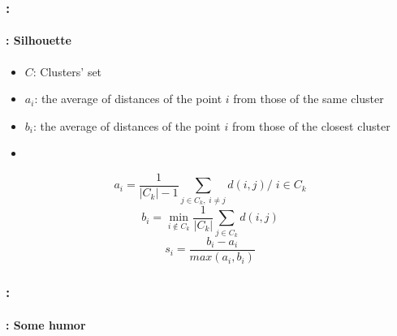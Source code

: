 \documentclass[xcolor=table]{beamer}
\begin{document}
\begin{frame}
	\frametitle{\insertshortsubtitle: \insertsection}
	\framesubtitle{\insertsubsection: Silhouette}
	
		\begin{itemize}
		\item $C$: Clusters' set
		\item $a_i$: the average of distances of the point $i$ from those of the same cluster
		\item $b_i$: the average of distances of the point $i$ from those of the closest cluster
		\item {}
	\end{itemize}
	
	\[a_i = \frac{1}{|C_k| - 1} \sum_{j \in C_k,\; i \ne j} d(i, j) / \; i \in C_k\]
	\[b_i = \min_{i \notin C_k} \frac{1}{|C_k|} \sum_{j \in C_k} d(i, j)\]
	\[s_i = \frac{b_i - a_i}{max(a_i, b_i)}\]
	
	
\end{frame}

\begin{frame}
	\frametitle{\insertshortsubtitle: \insertsection}
	\framesubtitle{\insertsubsection: Some humor}
	
	\begin{center}
	\end{center}
	
\end{frame}

\end{document}

